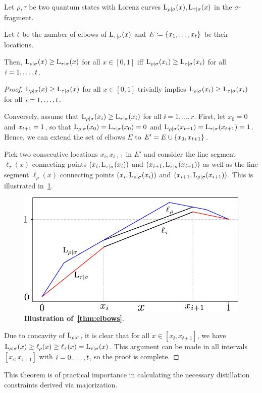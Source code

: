 \begin{theorem}
	Let $\rho, \tau$ be two quantum states with Lorenz curves $\lc{\rho}{\sigma}(x), \lc{\tau}{\sigma}(x)$ in the $\sigma$-fragment.
	
	Let $\tt$ be the number of elbows of $\lc{\tau}{\sigma}(x)$ and $E \coloneqq \{x_1, \dots, x_\tt\}$ be their locations.
	
	Then, $\lc{\rho}{\sigma}(x) \geq \lc{\tau}{\sigma}(x)$ for all $x \in [0,1]$ iff $\lc{\rho}{\sigma}(x_{\ii}) \geq \lc{\tau}{\sigma}(x_{\ii})$ for all $\ii =1,\dots,\tt$.
\end{theorem}
\begin{proof}	
	$\lc{\rho}{\sigma}(x) \geq \lc{\tau}{\sigma}(x)$ for all $x \in [0,1]$ trivially implies $\lc{\rho}{\sigma}(x_{\ii}) \geq \lc{\tau}{\sigma}(x_{\ii})$ for all $\ii = 1,\dots,\tt$.
	
	Conversely, assume that $\lc{\rho}{\sigma}(x_{\ii}) \geq \lc{\tau}{\sigma}(x_{\ii})$ for all $\ii = 1,\dots,r$.
	First, let $x_0 = 0$ and $x_{\tt+1} = 1$, so that $\lc{\rho}{\sigma}(x_0) = \lc{\tau}{\sigma}(x_0) = 0$ and $\lc{\rho}{\sigma}(x_{\tt+1}) = \lc{\tau}{\sigma}(x_{\tt+1}) = 1$.
	Hence, we can extend the set of elbows $E$ to $E' = E \cup \{x_0, x_{\tt+1}\}$.
	
	Pick two consecutive locations $x_{\ii}, x_{\ii+1}$ in $E'$ and consider the line segment $\ell_\tau(x)$ connecting points $(x_{\ii}, \lc{\tau}{\sigma}(x_{\ii}))$ and $(x_{\ii+1}, \lc{\tau}{\sigma}(x_{\ii+1}))$ as well as the line segment $\ell_\rho(x)$ connecting points $(x_{\ii}, \lc{\rho}{\sigma}(x_{\ii}))$ and $(x_{\ii+1}, \lc{\rho}{\sigma}(x_{\ii+1}))$.
	This is illustrated in~\cref{fig:elbows_proof}.
\begin{figure}[h]
    \centering
    \includegraphics[scale=0.6]{figs/elbows_proof.pdf}
    \caption{\textbf{Illustration of~\cref{thm:elbows}}.
    }
    \label{fig:elbows_proof}
\end{figure}

	Due to concavity of $\lc{\rho}{\sigma}$, it is clear that for all $x \in [x_{\ii}, x_{\ii+1}]$, we have $\lc{\rho}{\sigma}(x) \geq \ell_\rho(x) \geq \ell_\tau(x) = \lc{\tau}{\sigma}(x)$.
	This argument can be made in all intervals $[x_{\ii}, x_{\ii+1}]$ with $\ii=0,\dots,\tt$, so the proof is complete.
\end{proof}
This theorem is of practical importance in calculating the necessary distillation constraints derived via majorization.

